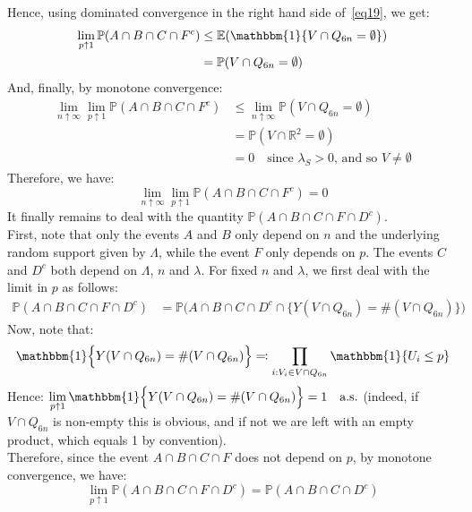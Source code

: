 \documentclass[10pt,a4paper]{amsart}
\theoremstyle{exampstyle}
\theoremstyle{exampnotations}
\begin{document}
Hence, using dominated convergence in the right hand side of~\eqref{eq19}, we get:
\begin{align*}
\lim_{p \uparrow 1} \mathbb{P}(A \cap B \cap C \cap F^c) &\leq \mathbb{E}(\mathbbm{1}\lbrace V \cap Q_{6n} = \emptyset \rbrace)
\\ &= \mathbb{P}(V \cap Q_{6n} = \emptyset)
\end{align*}
And, finally, by monotone convergence:
\begin{align*}
\lim_{n \uparrow \infty}\lim_{p \uparrow 1} \mathbb{P}(A \cap B \cap C \cap F^c) &\leq \lim_{n \uparrow \infty} \mathbb{P}(V \cap Q_{6n} = \emptyset)
\\ &= \mathbb{P}(V \cap \mathbb{R}^{2} = \emptyset)
\\ &= 0 \quad \text{since $\lambda_{S} > 0$, and so $V \neq \emptyset$}
\end{align*}
Therefore, we have:
\begin{equation}
    \label{eq20}
    \lim_{n \uparrow \infty}\lim_{p \uparrow 1} \mathbb{P}(A \cap B \cap C \cap F^c) = 0
\end{equation}
It finally remains to deal with the quantity $\mathbb{P}(A \cap B \cap C \cap F \cap D^{c})$. \\
First, note that only the events $A$ and $B$ only depend on $n$ and the underlying random support given by $\Lambda$, while the event $F$ only depends on $p$. The events $C$ and $D^c$ both depend on $\Lambda$, $n$ and $\lambda$. For fixed $n$ and $\lambda$, we first deal with the limit in $p$ as follows:
\begin{align*}
    \mathbb{P}(A \cap B \cap C \cap F \cap D^c) &= \mathbb{P}\Big(A \cap B \cap C \cap D^c \cap \lbrace Y(V \cap Q_{6n}) = \#(V \cap Q_{6n}) \rbrace \Big)
\end{align*}
Now, note that:
\begin{equation*}
    \mathbbm{1}\Big\lbrace Y(V \cap Q_{6n}) = \#(V \cap Q_{6n}) \Big\rbrace \eqqcolon \prod_{i : V_i \in V \cap Q_{6n}} \mathbbm{1} \lbrace U_i \leq p \rbrace
\end{equation*}
Hence: $\displaystyle \lim_{p \uparrow 1} \mathbbm{1}\Big\lbrace Y(V \cap Q_{6n}) = \#(V \cap Q_{6n}) \Big\rbrace = 1 \quad \text{a.s.}$ (indeed, if $V\cap Q_{6n}$ is non-empty this is obvious, and if not we are left with an empty product, which equals 1 by convention). \\
Therefore, since the event $A \cap B \cap C \cap F$ does not depend on $p$, by monotone convergence, we have:
\begin{equation*}
\lim_{p \uparrow 1} \mathbb{P}(A \cap B \cap C \cap F \cap D^{c}) = \mathbb{P}(A \cap B \cap C \cap D^c) 
\end{equation*}
\end{document}
